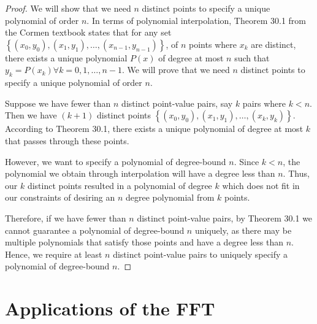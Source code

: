 \documentclass{article}
\renewcommand{\_}{\ifincsname_\else\legacyunderscore\fi}
\begin{document}
\begin{proof}
We will show that we need $n$ distinct points to specify a unique polynomial of order $n$. In terms of polynomial interpolation, Theorem 30.1 from the Cormen textbook states that for any set $\left\{ (x_0, y_0), (x_1, y_1), \hdots,(x_{n-1}, y_{n-1})\right\}$, of $n$ points where $x_k$ are distinct, there exists a unique polynomial $P(x)$ of degree at most $n$ such that $y_k=P(x_k) \forall k=0, 1, \hdots, n-1$. We will prove that we need $n$ distinct points to specify a unique polynomial of order $n$.

Suppose we have fewer than $n$ distinct point-value pairs, say $k$ pairs where $k < n$. Then we have $(k+1)$ distinct points $\left\{(x_0, y_0), (x_1, y_1), \hdots, (x_k, y_k)\right\}$. According to Theorem 30.1, there exists a unique polynomial of degree at most $k$ that passes through these points.

However, we want to specify a polynomial of degree-bound $n$. Since $k < n$, the polynomial we obtain through interpolation will have a degree less than $n$. Thus, our $k$ distinct points resulted in a polynomial of degree $k$ which does not fit in our constraints of desiring an $n$ degree polynomial from $k$ points. 

Therefore, if we have fewer than $n$ distinct point-value pairs, by Theorem 30.1 we cannot guarantee a polynomial of degree-bound $n$ uniquely, as there may be multiple polynomials that satisfy those points and have a degree less than $n$. Hence, we require at least $n$ distinct point-value pairs to uniquely specify a polynomial of degree-bound $n$.
\end{proof}

    \section*{Applications of the FFT}
\end{document}
